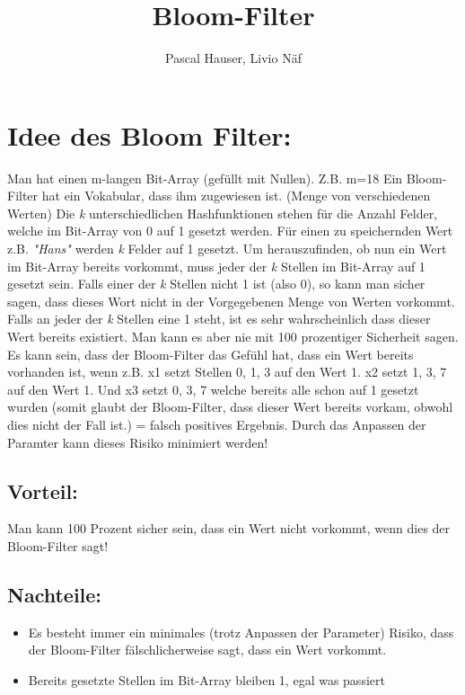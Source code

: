 \documentclass[12 pt]{article}
\author{Pascal Hauser, Livio Näf}
\title{Bloom-Filter}
\begin{document}
\maketitle
\section{Idee des Bloom Filter: }
Man hat einen m-langen Bit-Array (gefüllt mit Nullen). Z.B. m=18
Ein Bloom-Filter hat ein Vokabular, dass ihm zugewiesen ist. (Menge von verschiedenen Werten)
Die \emph{k} unterschiedlichen Hashfunktionen stehen für die Anzahl Felder, welche im Bit-Array von 0 auf 1 gesetzt werden.
Für einen zu speichernden Wert z.B. \emph{"Hans"} werden \emph{k} Felder auf 1 gesetzt.
Um herauszufinden, ob nun ein Wert im Bit-Array bereits vorkommt, muss jeder der \emph{k} Stellen im Bit-Array auf 1 gesetzt sein. Falls einer der \emph{k} Stellen nicht 1 ist (also 0), so kann man sicher sagen, dass dieses Wort nicht in der Vorgegebenen Menge von Werten vorkommt.
Falls an jeder der \emph{k} Stellen eine 1 steht, ist es sehr wahrscheinlich dass dieser Wert bereits existiert. Man kann es aber nie mit 100 prozentiger Sicherheit sagen.
Es kann sein, dass der Bloom-Filter das Gefühl hat, dass ein Wert bereits vorhanden ist, wenn z.B. x1 setzt Stellen 0, 1, 3 auf den Wert 1. x2 setzt 1, 3, 7 auf den Wert 1. Und x3 setzt 0, 3, 7 welche bereits alle schon auf 1 gesetzt wurden (somit glaubt der Bloom-Filter, dass dieser Wert bereits vorkam, obwohl dies nicht der Fall ist.) = falsch positives Ergebnis. Durch das Anpassen der Paramter kann dieses Risiko minimiert werden!
\subsection{Vorteil:}
Man kann 100 Prozent sicher sein, dass ein Wert nicht vorkommt, wenn dies der Bloom-Filter sagt!
\subsection{Nachteile:}
\begin{itemize}
    \item{Es besteht immer ein minimales (trotz Anpassen der Parameter) Risiko, dass der Bloom-Filter fälschlicherweise sagt, dass ein Wert vorkommt.}
    \item{Bereits gesetzte Stellen im Bit-Array bleiben 1, egal was passiert}
\end{itemize}
\end{document}
